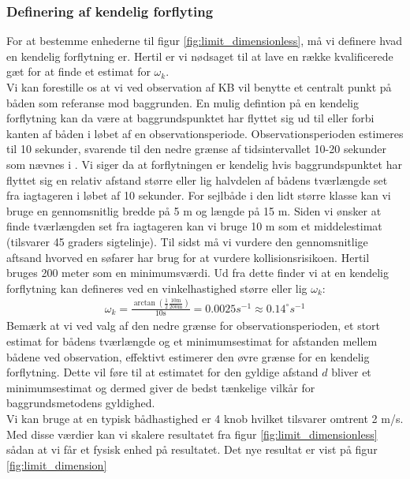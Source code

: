 \documentclass[%
 reprint,
nofootinbib,
aps,
]{revtex4-1}
\begin{document}
\subsubsection{Definering af kendelig forflyting}
For at bestemme enhederne til figur \ref{fig:limit_dimensionless}, må vi definere hvad en kendelig forflytning er. Hertil er vi nødsaget til at lave en række kvalificerede gæt for at finde et estimat for $\omega_k$. \\
Vi kan forestille os at vi ved observation af KB vil benytte et centralt punkt på båden som referanse mod baggrunden. En mulig defintion på en kendelig forflytning kan da være at baggrundspunktet har flyttet sig ud til eller forbi kanten af båden i løbet af en observationsperiode. Observationsperioden estimeres til 10 sekunder, svarende til den nedre grænse af tidsintervallet 10-20 sekunder som nævnes i \cite{duelighed}. Vi siger da at forflytningen er kendelig hvis baggrundspunktet har flyttet sig en relativ afstand større eller lig halvdelen af bådens tværlængde set fra iagtageren i løbet af 10 sekunder. For sejlbåde i den lidt større klasse kan vi bruge en gennomsnitlig bredde på 5 m og længde på 15 m. Siden vi ønsker at finde tværlængden set fra iagtageren kan vi bruge 10 m som et middelestimat (tilsvarer 45 graders sigtelinje). Til sidst må vi vurdere den gennomsnitlige aftsand hvorved en søfarer har brug for at vurdere kollisionsrisikoen. Hertil bruges 200 meter som en minimumsværdi. Ud fra dette finder vi at en kendelig forflytning kan defineres ved en vinkelhastighed større eller lig $\omega_k$:
\begin{align}
  \omega_k = \frac{\arctan{(\frac{1}{2}\frac{10 \text{m}}{200 \text{m}})}}{10 \text{s}} = 0.0025 s^{-1} \approx  0.14^{\circ}s^{-1}
  \label{eq:omega_k}
\end{align}
Bemærk at vi ved valg af den nedre grænse for observationsperioden, et stort estimat for bådens tværlængde og et minimumsestimat for afstanden mellem bådene ved observation,  effektivt estimerer den øvre grænse for en kendelig forflytning. Dette vil føre til at estimatet for den gyldige afstand $d$ bliver et minimumsestimat og dermed giver de bedst tænkelige vilkår for baggrundsmetodens gyldighed. \\
Vi kan bruge at en typisk bådhastighed er 4 knob hvilket tilsvarer omtrent 2 m/s. Med disse værdier kan vi skalere resultatet fra figur \ref{fig:limit_dimensionless} sådan at vi får et fysisk enhed på resultatet. Det nye resultat er vist på figur \ref{fig:limit_dimension}
\end{document}
